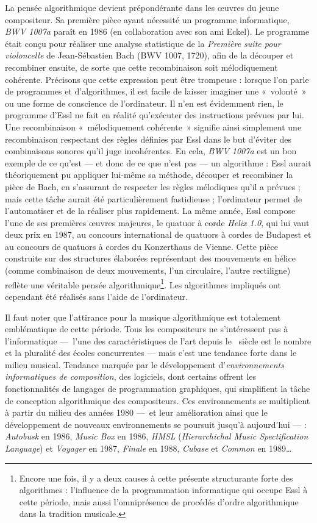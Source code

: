 \documentclass[a4paper,12pt]{article}
\newcommand{\guill}[1]{«~#1~»}
\begin{document}
La pensée algorithmique devient prépondérante dans les œuvres du jeune compositeur. Sa première pièce ayant nécessité un programme informatique, \emph{BWV 1007a} paraît en 1986 (en collaboration avec son ami Eckel). Le programme était conçu pour réaliser une analyse statistique de la \emph{Première suite pour violoncelle} de Jean-Sébastien Bach (BWV 1007, 1720), afin de la découper et recombiner ensuite, de sorte que cette recombinaison soit mélodiquement cohérente. Précisons que cette expression peut être trompeuse : lorsque l'on parle de programmes et d'algorithmes, il est facile de laisser imaginer une \guill{volonté} ou une forme de conscience de l'ordinateur. Il n'en est évidemment rien, le programme d'Essl ne fait en réalité qu'exécuter des instructions prévues par lui. Une recombinaison \guill{mélodiquement cohérente} signifie ainsi simplement une recombinaison respectant des règles définies par Essl dans le but d'éviter des combinaisons sonores qu'il juge incohérentes. En cela, \emph{BWV 1007a} est un bon exemple de ce qu'est --- et donc de ce que n'est pas --- un algorithme : Essl aurait théoriquement pu appliquer lui-même sa méthode, découper et recombiner la pièce de Bach, en s'assurant de respecter les règles mélodiques qu'il a prévues ; mais cette tâche aurait été particulièrement fastidieuse ; l'ordinateur permet de l'automatiser et de la réaliser plus rapidement. La même année, Essl compose l'une de ses premières œuvres majeures, le quatuor à corde \emph{Helix 1.0}, qui lui vaut deux prix en 1987, au concours international de quatuors à cordes de Budapest et au concours    de quatuors à cordes du Konzerthaus de Vienne. Cette pièce construite sur des structures élaborées représentant des mouvements en hélice (comme combinaison de deux mouvements, l'un circulaire, l'autre rectiligne) reflète une véritable pensée algorithmique\footnote{Encore une fois, il y a deux causes à cette présente structurante forte des algorithmes : l'influence de la programmation informatique qui occupe Essl à cette période, mais aussi l'omniprésence de procédés d'ordre algorithmique dans la tradition musicale.}. Les algorithmes impliqués ont cependant été réalisés sans l'aide de l'ordinateur.

Il faut noter que l'attirance pour la musique algorithmique est totalement emblématique de cette période. Tous les compositeurs ne s'intéressent pas à l'informatique ---~l'une des caractéristiques de l'art depuis le \XXe~siècle est le nombre et la pluralité des écoles concurrentes --- mais c'est une tendance forte dans le milieu musical. Tendance marquée par le développement d'\emph{environnements informatiques de composition}, des logiciels, dont certains offrent les fonctionnalités de langages de programmation graphiques, qui simplifient la tâche de conception algorithmique des compositeurs. Ces environnements se multiplient à partir du milieu des années 1980 ---~et leur amélioration ainsi que le développement de nouveaux environnements se poursuit jusqu'à aujourd'hui --- : \emph{Autobusk} en 1986, \emph{Music Box} en 1986, \emph{HMSL} (\emph{Hierarchichal Music Spectification Language}) et \emph{Voyager} en 1987, \emph{Finale} en 1988, \emph{Cubase} et \emph{Common} en 1989\dots
\end{document}
